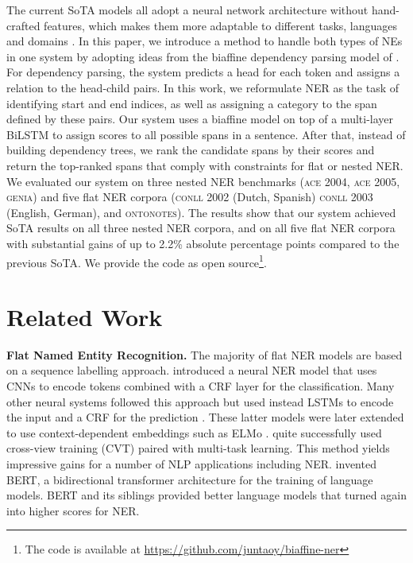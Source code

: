 \documentclass[11pt,a4paper]{article}
\newcommand{\ACRO}[1]{\textsc{#1}}
\newcommand{\GENIA}{\ACRO{genia}}
\newcommand{\ACEFOUR}{\ACRO{ace 2004}}
\newcommand{\ACEFIVE}{\ACRO{ace 2005}}
\newcommand{\CONLLTWO}{\ACRO{conll 2002}}
\newcommand{\CONLLTHREE}{\ACRO{conll 2003}}
\newcommand{\ONTONOTES}{\ACRO{ontonotes}}
\begin{document}
The current SoTA models all adopt 
a neural network architecture without hand-crafted features,
which makes them more adaptable to different tasks, languages and domains 
\cite{glample2016-ner,chiu2016named,peters2018elmo,devlin2019bert,ju-etal-2018-neural,sohrab-miwa-2018-deep,strakova-etal-2019-neural}. 
In this paper, we introduce a method to handle both types of NEs in one system by adopting ideas from the biaffine dependency parsing model of . 
For dependency parsing, the system predicts a head for each token and assigns a relation to the head-child pairs. 
In this work, we reformulate NER as the task of identifying start and end indices, as well as assigning a category to the span defined by these pairs. 
Our system uses a biaffine model on top of a multi-layer BiLSTM to assign scores to all possible spans in a sentence. After that, instead of building dependency trees, we rank the candidate spans by their scores and return the top-ranked spans that comply with constraints for flat or nested NER. 
We evaluated our system on three nested NER benchmarks ({\ACEFOUR}, {\ACEFIVE}, {\GENIA}) and five flat NER corpora ({\CONLLTWO} (Dutch, Spanish) {\CONLLTHREE} (English, German), and {\ONTONOTES}). 
The results show that our system achieved SoTA results on all three nested NER corpora, and on all five flat NER corpora with substantial gains of up to 2.2\% absolute percentage points compared to the previous SoTA. We provide the code as open source\footnote{The code is available at \url{https://github.com/juntaoy/biaffine-ner}}.


\section{Related Work}

\textbf{Flat Named Entity Recognition.} 
The majority of flat NER models are based on a sequence labelling approach.
 introduced a neural NER model that uses CNNs to encode tokens combined with a CRF layer for the classification. 
Many other neural systems followed this approach but used instead LSTMs to encode the input and a CRF for the prediction \cite{glample2016-ner,ma-hovy-2016-end,chiu2016named}. 
These latter models were later extended to use context-dependent embeddings such as ELMo \cite{peters2018elmo}. 
  quite successfully used cross-view training (CVT) paired with multi-task learning. This method yields impressive gains for a number of NLP applications including NER.
 invented BERT, a  bidirectional transformer architecture for the training of language models. BERT and its siblings provided better language models that turned again into higher scores for NER.
 
\end{document}

